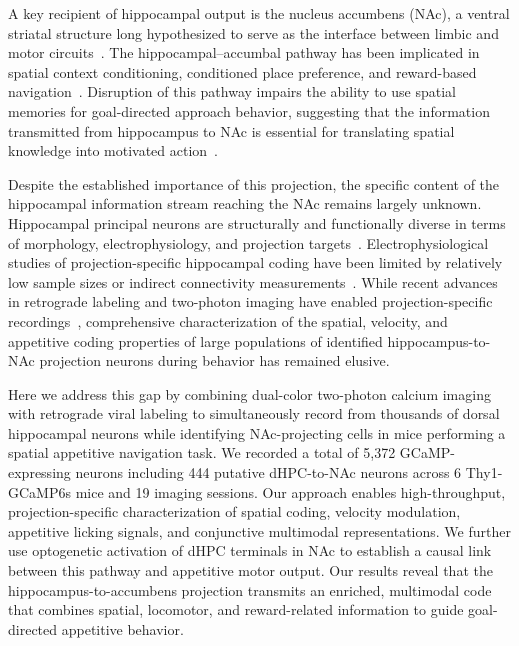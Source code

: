 \documentclass[11pt]{article}
\begin{document}
A key recipient of hippocampal output is the nucleus accumbens (NAc), a ventral striatal structure long hypothesized to serve as the interface between limbic and motor circuits~\citep{mogenson1980, floresco2015}. The hippocampal--accumbal pathway has been implicated in spatial context conditioning, conditioned place preference, and reward-based navigation~\citep{ito2008, leshan2014, trouche2019}. Disruption of this pathway impairs the ability to use spatial memories for goal-directed approach behavior, suggesting that the information transmitted from hippocampus to NAc is essential for translating spatial knowledge into motivated action~\citep{britt2012}.

Despite the established importance of this projection, the specific content of the hippocampal information stream reaching the NAc remains largely unknown. Hippocampal principal neurons are structurally and functionally diverse in terms of morphology, electrophysiology, and projection targets~\citep{danielson2016, grosmark2016}. Electrophysiological studies of projection-specific hippocampal coding have been limited by relatively low sample sizes or indirect connectivity measurements~\citep{ciocchi2015}. While recent advances in retrograde labeling and two-photon imaging have enabled projection-specific recordings~\citep{tervo2016, dombeck2010}, comprehensive characterization of the spatial, velocity, and appetitive coding properties of large populations of identified hippocampus-to-NAc projection neurons during behavior has remained elusive.

Here we address this gap by combining dual-color two-photon calcium imaging with retrograde viral labeling to simultaneously record from thousands of dorsal hippocampal neurons while identifying NAc-projecting cells in mice performing a spatial appetitive navigation task. We recorded a total of 5,372 GCaMP-expressing neurons including 444 putative dHPC-to-NAc neurons across 6 Thy1-GCaMP6s mice and 19 imaging sessions. Our approach enables high-throughput, projection-specific characterization of spatial coding, velocity modulation, appetitive licking signals, and conjunctive multimodal representations. We further use optogenetic activation of dHPC terminals in NAc to establish a causal link between this pathway and appetitive motor output. Our results reveal that the hippocampus-to-accumbens projection transmits an enriched, multimodal code that combines spatial, locomotor, and reward-related information to guide goal-directed appetitive behavior.
\end{document}
